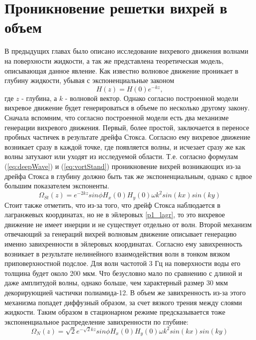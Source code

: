 \chapter{Проникновение решетки вихрей в объем} \label{chapt6}

В предыдущих главах было описано исследование вихревого движения волнами на поверхности жидкости, а так же представлена теоретическая модель, описывающая данное явление. Как известно \cite{land} волновое движение проникает в глубину жидкости, убывая с экспоненциальные законом 
\begin{equation}
 \label{eq:deepWave}
H(z) = H(0) e^{-kz},
\end{equation}
 где $z$ - глубина, а $k$ - волновой вектор. Однако согласно построенной модели вихревое движение будет генерироваться в объеме по несколько другому закону. Сначала вспомним, что согласно построенной модели есть два механизме генерации вихревого движения. 
	Первый, более простой, заключается в переносе пробных частичек в результате дрейфа Стокса. Согласно ему вихревое движение возникает сразу в каждой точке, где появляется волны, и исчезает сразу же как волны затухают или уходят из исследуемой области. Т.е. согласно формулам (\ref{eq:deepWave}) и (\ref{eq:vortStand}) проникновение вихрей возникающих из-за дрейфа Стокса в глубину должно быть так же экспоненциальным, однако с вдвое большим показателем экспоненты.
\begin{equation}
 \label{eq:deepStocks}
\Omega_{St}(z)  = e^{-2kz} sin \phi H_x(0) H_y(0) \omega k^2 sin(kx)sin(ky)
\end{equation}
Стоит также отметить, что из-за того, что дрейф Стокса наблюдается в лагранжевых координатах, но не в эйлеровых \ref{p1_lagr}, то это вихревое движение не имеет инерции и не существует отдельно от волн.
	Второй механизм отвечающий за генераций вихрей волновым движение описывает генерацию именно завихренности в эйлеровых координатах. Согласно ему завихренность возникает в результате нелинейного взаимодействия волн в тонком вязком приповерхностной подслое. Для волн частотой 3 Гц на поверхности воды его толщина будет около  200 мкм. Что безусловно мало по сравнению с длиной и даже амплитудой волны, однако больше, чем характерный размер 30 мкм декорирующией частички полиамида-12. В объем же завихренность из-за этого механизма попадет диффузный образом, за счет вязкого трения между слоями жидкости. Таким образом в стационарном режиме предсказывается тоже экспоненциальное распределение завихренности по глубине:
\begin{equation}
 \label{eq:deepEyler}
\Omega_N(z)  = \sqrt{2}e^{-\sqrt{2}kz} sin \phi H_x(0) H_y(0) \omega k^2 sin(kx)sin(ky)
\end{equation}

